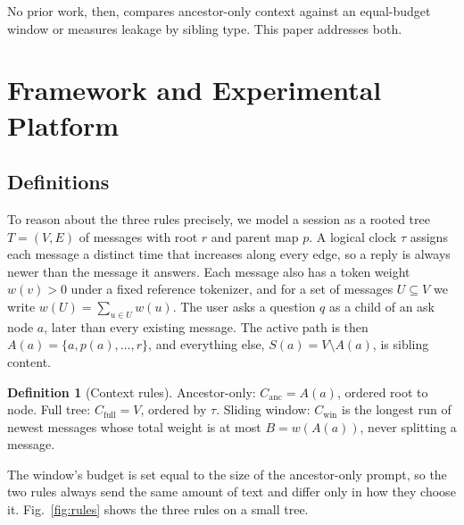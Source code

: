 \documentclass[conference]{IEEEtran}
\theoremstyle{definition}
\newtheorem{definition}{Definition}
\newcommand{\A}{A(a)}
\newcommand{\Sib}{S(a)}
\newcommand{\anc}{\mathrm{anc}}
\newcommand{\full}{\mathrm{full}}
\newcommand{\win}{\mathrm{win}}
\begin{document}
No prior work, then, compares ancestor-only context against an equal-budget window or measures leakage by sibling type. This paper addresses both.

\section{Framework and Experimental Platform}

\subsection{Definitions}

To reason about the three rules precisely, we model a session as a rooted tree $T=(V,E)$ of messages with root $r$ and parent map $p$. A logical clock $\tau$ assigns each message a distinct time that increases along every edge, so a reply is always newer than the message it answers. Each message also has a token weight $w(v)>0$ under a fixed reference tokenizer, and for a set of messages $U\subseteq V$ we write $w(U)=\sum_{u\in U}w(u)$. The user asks a question $q$ as a child of an ask node $a$, later than every existing message. The active path is then $\A=\{a,p(a),\dots,r\}$, and everything else, $\Sib=V\setminus\A$, is sibling content.

\begin{definition}[Context rules]
Ancestor-only: $C_\anc=\A$, ordered root to node. Full tree: $C_\full=V$, ordered by $\tau$. Sliding window: $C_\win$ is the longest run of newest messages whose total weight is at most $B=w(\A)$, never splitting a message.
\end{definition}

The window's budget is set equal to the size of the ancestor-only prompt, so the two rules always send the same amount of text and differ only in how they choose it. Fig.~\ref{fig:rules} shows the three rules on a small tree.
\end{document}
